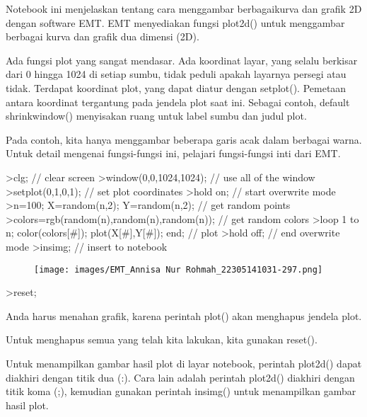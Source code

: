 \documentclass[a4paper,10pt]{article}
\begin{document}
\begin{eulernotebook}
\begin{eulercomment}
\end{eulercomment}
\eulersubheading{}
\eulersubheading{}
\eulersubheading{}
\begin{eulercomment}



\end{eulercomment}
\begin{eulercomment}
Notebook ini menjelaskan tentang cara menggambar berbagaikurva dan
grafik 2D dengan software EMT. EMT menyediakan fungsi plot2d() untuk
menggambar berbagai kurva dan grafik dua dimensi (2D).\\
\end{eulercomment}
\begin{eulercomment}
Ada fungsi plot yang sangat mendasar. Ada koordinat layar, yang selalu
berkisar dari 0 hingga 1024 di setiap sumbu, tidak peduli apakah
layarnya persegi atau tidak. Terdapat koordinat plot, yang dapat
diatur dengan setplot(). Pemetaan antara koordinat tergantung pada
jendela plot saat ini. Sebagai contoh, default shrinkwindow()
menyisakan ruang untuk label sumbu dan judul plot.

Pada contoh, kita hanya menggambar beberapa garis acak dalam berbagai
warna. Untuk detail mengenai fungsi-fungsi ini, pelajari fungsi-fungsi
inti dari EMT.
\end{eulercomment}
\begin{eulerprompt}
>clg; // clear screen
>window(0,0,1024,1024); // use all of the window
>setplot(0,1,0,1); // set plot coordinates
>hold on; // start overwrite mode
>n=100; X=random(n,2); Y=random(n,2);  // get random points
>colors=rgb(random(n),random(n),random(n)); // get random colors
>loop 1 to n; color(colors[#]); plot(X[#],Y[#]); end; // plot
>hold off; // end overwrite mode
>insimg; // insert to notebook
\end{eulerprompt}
\begin{figure}[h]
    \centering
    \texttt{[image: images/EMT\_Annisa Nur Rohmah\_22305141031-297.png]}
\end{figure}
\begin{eulerprompt}
>reset;
\end{eulerprompt}
\begin{eulercomment}
Anda harus menahan grafik, karena perintah plot() akan menghapus
jendela plot.

Untuk menghapus semua yang telah kita lakukan, kita gunakan reset().

Untuk menampilkan gambar hasil plot di layar notebook, perintah
plot2d() dapat diakhiri dengan titik dua (:). Cara lain adalah
perintah plot2d() diakhiri dengan titik koma (;), kemudian gunakan
perintah insimg() untuk menampilkan gambar hasil plot.


\end{eulercomment}
\end{eulernotebook}
\end{document}

